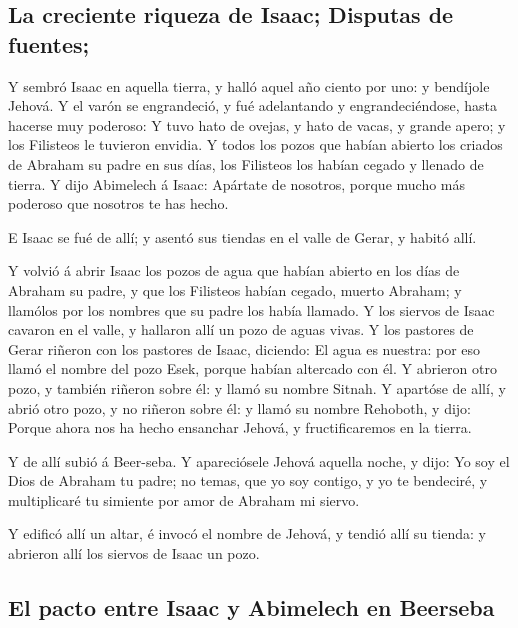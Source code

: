 \hypertarget{la-creciente-riqueza-de-isaac-disputas-de-fuentes}{%
\subsection{La creciente riqueza de Isaac; Disputas de
fuentes;}\label{la-creciente-riqueza-de-isaac-disputas-de-fuentes}}

 Y sembró Isaac en aquella tierra, y halló aquel año ciento
por uno: y bendíjole Jehová.  Y el varón se engrandeció, y
fué adelantando y engrandeciéndose, hasta hacerse muy poderoso:
 Y tuvo hato de ovejas, y hato de vacas, y grande apero; y
los Filisteos le tuvieron envidia.  Y todos los pozos que
habían abierto los criados de Abraham su padre en sus días, los
Filisteos los habían cegado y llenado de tierra.  Y dijo
Abimelech á Isaac: Apártate de nosotros, porque mucho más poderoso que
nosotros te has hecho.

 E Isaac se fué de allí; y asentó sus tiendas en el valle
de Gerar, y habitó allí.

 Y volvió á abrir Isaac los pozos de agua que habían
abierto en los días de Abraham su padre, y que los Filisteos habían
cegado, muerto Abraham; y llamólos por los nombres que su padre los
había llamado.  Y los siervos de Isaac cavaron en el valle,
y hallaron allí un pozo de aguas vivas.  Y los pastores de
Gerar riñeron con los pastores de Isaac, diciendo: El agua es nuestra:
por eso llamó el nombre del pozo Esek, porque habían altercado con él.
 Y abrieron otro pozo, y también riñeron sobre él: y llamó
su nombre Sitnah.  Y apartóse de allí, y abrió otro pozo, y
no riñeron sobre él: y llamó su nombre Rehoboth, y dijo: Porque ahora
nos ha hecho ensanchar Jehová, y fructificaremos en la tierra.

 Y de allí subió á Beer-seba.  Y apareciósele
Jehová aquella noche, y dijo: Yo soy el Dios de Abraham tu padre; no
temas, que yo soy contigo, y yo te bendeciré, y multiplicaré tu simiente
por amor de Abraham mi siervo.

 Y edificó allí un altar, é invocó el nombre de Jehová, y
tendió allí su tienda: y abrieron allí los siervos de Isaac un pozo.

\hypertarget{el-pacto-entre-isaac-y-abimelech-en-beerseba}{%
\subsection{El pacto entre Isaac y Abimelech en
Beerseba}\label{el-pacto-entre-isaac-y-abimelech-en-beerseba}}

